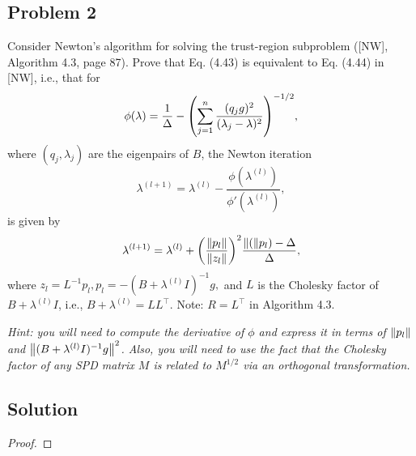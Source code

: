 \documentclass[12pt]{report}
\begin{document}
\begin{problem}%
\subsection*{Problem 2}

Consider Newton's algorithm for solving the trust-region subproblem ([NW], Algorithm 4.3, page 87). Prove that Eq. (4.43) is equivalent to Eq. (4.44) in [NW], i.e., that for
\[
     \phi(\lambda) = \frac{1}{\Delta} - {\left(\sum_{j=1}^n \frac{(q_j g)^2}{(\lambda_j - \lambda)^2}\right)}^{-1/2},
\]
where $(q_j,\lambda_j)$ are the eigenpairs of $B$, the Newton iteration
\[
     \lambda^{(l+1)} = \lambda^{(l)} - \frac{\phi(\lambda^{(l)})}{\phi'(\lambda^{(l)})},
\]
is given by
\[
    \lambda^{(l+1)} = \lambda^{(l)} + {\left(\frac{{\left\|p_l\right\|}}{{\left\|z_l\right\|}}\right)}^2 \frac{{\left\|(\right\|}p_l) - \Delta}{\Delta},
\]
where $z_l = L^{-1}p_l, p_l = -(B + \lambda^{(l)}I)^{-1}g,$ and $L$ is the Cholesky factor of $B + \lambda^{(l)}I$, i.e., $B + \lambda^{(l)} = LL^\top$. Note: $R = L^\top$ in Algorithm 4.3.


\noindent
\textit{Hint: you will need to compute the derivative of $\phi$ and express it in terms of ${\left\|p_l\right\|}$ and ${\left\|(B + \lambda^{(l)}I)^{-1}g\right\|}^2$. Also, you will need to use the fact that the Cholesky factor of any SPD matrix $M$ is related to $M^{1/2}$ via an orthogonal transformation.}




\subsection*{Solution}
\begin{proof}


\end{proof}
\end{problem}
\end{document}
